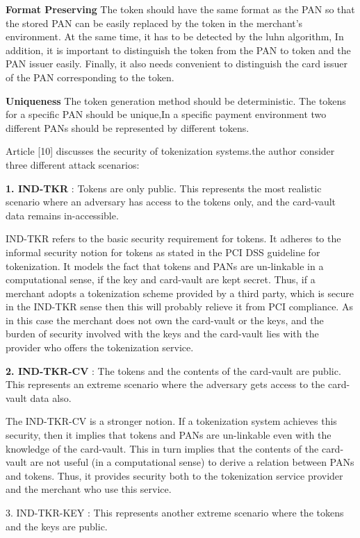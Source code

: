 \documentclass[journal]{IEEEtran}
\begin{document}
\textbf{Format Preserving}
The token should have the same format as the PAN so that the stored PAN can be easily replaced by the token in the merchant's environment. At the same time, it has to be detected by the luhn algorithm, In addition, it is important to distinguish the token from the PAN to token and the PAN issuer easily. Finally, it also needs convenient to distinguish the card issuer of the PAN corresponding to the token.

\textbf{Uniqueness}
The token generation method should be deterministic. The tokens for a specific PAN should be unique,In a specific payment environment two different PANs should be represented by different tokens.

Article [10] discusses the security of tokenization systems.the author consider three different attack scenarios: 

\textbf{1. IND-TKR }: Tokens are only public. This represents the most realistic scenario where an adversary has
access to the tokens only, and the card-vault data remains in-accessible.

IND-TKR refers to the basic security requirement for tokens. It adheres to the informal security notion for tokens as stated in the PCI DSS guideline for tokenization. It models the fact that tokens and PANs are un-linkable in a computational sense, if the key and card-vault are kept secret. Thus, if a merchant adopts a tokenization scheme provided by a third party, which is secure in the IND-TKR sense then this will probably relieve it from PCI compliance. As in this case the merchant does not own the card-vault or the keys, and the burden of security involved with the keys and the card-vault lies with the provider who offers the tokenization service.

\textbf{2. IND-TKR-CV }: The tokens and the contents of the card-vault are public. This represents an extreme scenario where the adversary gets access to the card-vault data also.

The IND-TKR-CV is a stronger notion. If a tokenization system achieves this security, then it implies that tokens and PANs are un-linkable even with the knowledge of the card-vault. This in turn implies that the contents of the card-vault are not useful (in a computational sense) to derive a relation between PANs and tokens. Thus, it provides security both to the tokenization service provider and the merchant who use this service.

3. IND-TKR-KEY : This represents another extreme scenario where the tokens and the keys are public.
\end{document}
